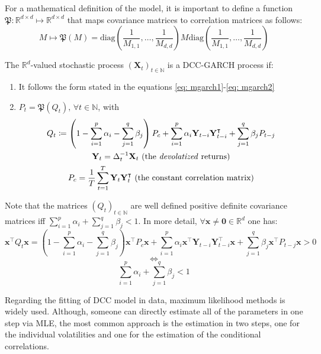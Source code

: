\documentclass[a4paper, oneside]{discothesis}
\begin{document}
For a mathematical definition of the model, it is important to define a function $\mathfrak{P}: \mathbb{R}^{d\times d}\mapsto\mathbb{R}^{d\times d}$ that maps covariance matrices to correlation matrices as follows:
\begin{equation}\label{cor_fun}
    M \longmapsto\mathfrak{P}(M) = \text{diag}\left(\frac{1}{M_{1,1}}, \dots, \frac{1}{M_{d,d}}\right)M  \text{diag}\left(\frac{1}{M_{1,1}}, \dots, \frac{1}{M_{d,d}}\right)
\end{equation}
\begin{definition}\label{dcc}
The $\mathbb{R}^d$-valued stochastic process $(\mathbf{X}_t)_{t\in\mathbb{N}}$ is a DCC-GARCH process if:
\begin{enumerate}
    \item  It follows the form stated in the equations \ref{eq: mgarch1}-\ref{eq: mgarch2}
    \item $P_t = \mathfrak{P}(Q_t) \text{, }\forall t\in\mathbb{N}$, with 
    \begin{gather}
        Q_t\coloneqq \left(1-\sum_{i=1}^p \alpha_i - \sum_{j=1}^q \beta_j\right)P_c+\sum_{i=1}^p\alpha_i\mathbf{Y}_{t-i}\mathbf{Y}_{t-i}^\intercal + \sum_{j=1}^q\beta_j P_{t-j}\\\mathbf{Y}_t= \Delta_t^{-1}\mathbf{X}_t\text{   (the \textit{devolatized} returns)}\\
        P_c = \frac{1}{T}\sum_{t=1}^T \mathbf{Y}_t\mathbf{Y}_t^\intercal\text{   (the constant correlation matrix)}
    \end{gather}
\end{enumerate}
\end{definition}
  \begin{mdframed}\begin{remark}\label{alpha_beta}
Note that the matrices $(Q_t)_{t\in\mathbb{N}}$ are well defined positive definite covariance matrices iff $\sum_{i=1}^p \alpha_i + \sum_{j=1}^q \beta_j<1$. In more detail,  $\forall \mathbf{x}\neq\mathbf{0}\in\mathbb{R}^d$ one has:
\scriptsize
\[\mathbf{x}^\intercal Q_t\mathbf{x} = \left(1-\sum_{i=1}^p \alpha_i - \sum_{j=1}^q \beta_j\right)\mathbf{x}^\intercal P_c\mathbf{x}+\sum_{i=1}^p\alpha_i\mathbf{x}^\intercal\mathbf{Y}_{t-i}\mathbf{Y}_{t-i}^\intercal\mathbf{x} + \sum_{j=1}^q\beta_j \mathbf{x}^\intercal P_{t-j}\mathbf{x}>0\]\[\Longleftrightarrow\]\[\sum_{i=1}^p \alpha_i + \sum_{j=1}^q \beta_j<1\]
\end{remark}\end{mdframed}  
\normalsize

Regarding the fitting of DCC model in data, maximum likelihood methods is widely used. Although, someone can directly estimate all of the parameters in one step via MLE, the most common approach is the estimation in two steps, one for the individual volatilities and one for the estimation of the conditional correlations. 
\end{document}

